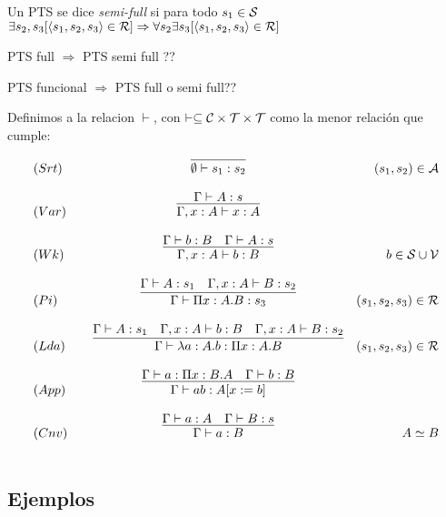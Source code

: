 \begin{definition}
Un PTS se dice \emph{semi-full} si para todo $s_1 \in \mathcal{S}$
$\exists s_2, s_3 [\langle s_1, s_2, s_3 \rangle \in \mathcal{R} ] \Rightarrow \forall s_2 \exists s_3 [\langle s_1, s_2, s_3 \rangle \in \mathcal{R} ]$
\end{definition}


\begin{lemma}
 PTS full $\Rightarrow$ PTS semi full ??


 PTS funcional $\Rightarrow$ PTS full o semi full??
\end{lemma}

\begin{definition}
Definimos a la relacion $\vdash$, con $\vdash \subseteq \mathcal{C}\times\mathcal{T}\times\mathcal{T}$ como
la menor relación que cumple:


\[
\begin{array}{llcr}
	(Srt) & &\infer{\emptyset \vdash s_{1} : s_{2}}{} & (s_{1},s_{2}) \in\cA \\ \\
	(Var) & &\infer{\Gamma, x:A \vdash x:A}{\Gamma\vdash A:s} & \\ \\
	(Wk)  & &\infer{\Gamma, x:A \vdash b:B}{\Gamma\vdash b:B & \Gamma\vdash A:s} & b\in\cS\cup\cV \\ \\
	(Pi)  & &\infer{\Gamma \vdash \Pi x:A.B : s_{3}}{\Gamma\vdash A:s_{1} & \Gamma, x:A \vdash B:s_{2}} &  (s_1,s_2,s_3)\in\cR\\ \\
	(Lda) & &\infer{\Gamma \vdash \lambda a:A.b : \Pi x:A.B }{\Gamma\vdash A:s_{1} & \Gamma, x:A \vdash b:B &\Gamma, x:A \vdash B:s_{2}} &  (s_1,s_2,s_3)\in\cR\\ \\
	(App) & &\infer{\Gamma \vdash a b : A[x:= b] }{\Gamma\vdash a : \Pi x:B.A & \Gamma \vdash b:B} &  \\ \\
	(Cnv) & &\infer{\Gamma \vdash a:B}{\Gamma\vdash a:A & \Gamma\vdash B:s} & A \simeq B \\ \\
	
\end{array}
\]

\end{definition}

\subsection{Ejemplos}

